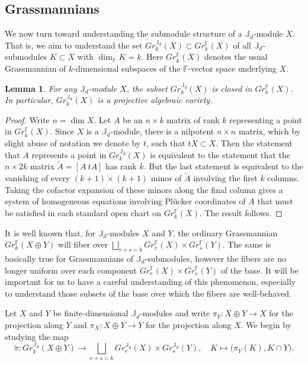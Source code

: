 \documentclass{amsart}
\numberwithin{equation}{section}
\newtheorem{lemma}[theorem]{Lemma}
\theoremstyle{definition}
\def\FF{\mathbb{F}}
\def\JJ{\mathbb{J}}
\def\dim{\operatorname{dim}}
\begin{document}
\subsection{Grassmannians}\label{sec:grassmannians}
We now turn toward understanding the submodule structure of a $\JJ_d$-module $X$.  That is, we aim to understand the set $Gr_k^{\JJ_d}(X)\subset Gr_k^\FF(X)$ of all $\JJ_d$-submodules $K\subset X$ with $\dim_\FF K=k$.  Here $Gr_k^\FF(X)$ denotes the usual Grassmannian of $k$-dimensional subspaces of the $\FF$-vector space underlying $X$.
\begin{lemma}\label{le:Grassmannian subvariety}
  For any $\JJ_d$-module $X$, the subset $Gr_k^{\JJ_d}(X)$ is closed in $Gr_k^\FF(X)$.  In particular, $Gr_k^{\JJ_d}(X)$ is a projective algebraic variety.
\end{lemma}
\begin{proof}
  Write $n=\dim X$.  Let $A$ be an $n\times k$ matrix of rank $k$ representing a point in $Gr_k^\FF(X)$.  Since $X$ is a $\JJ_d$-module, there is a nilpotent $n\times n$ matrix, which by slight abuse of notation we denote by $t$, such that $tX\subset X$.  Then the statement that $A$ represents a point in $Gr_k^{\JJ_d}(X)$ is equivalent to the statement that the $n\times 2k$ matrix $\tilde A=[A\ tA]$ has rank $k$.  But the last statement is equivalent to the vanishing of every $(k+1)\times(k+1)$ minor of $\tilde A$ involving the first $k$ columns.  Taking the cofactor expansion of these minors along the final column gives a system of homogeneous equations involving Pl\"ucker coordinates of $A$ that must be satisfied in each standard open chart on $Gr_k^\FF(X)$.  The result follows.
\end{proof}

It is well known that, for $\JJ_d$-modules $X$ and $Y$, the ordinary Grassmannian $Gr_k^\FF(X\oplus Y)$ will fiber over $\bigsqcup_{r+s=k} Gr_r^\FF(X)\times Gr_s^\FF(Y)$.  The same is basically true for Grassmannians of $\JJ_d$-submodules, however the fibers are no longer uniform over each component $Gr_r^\FF(X)\times Gr_s^\FF(Y)$ of the base.  It will be important for us to have a careful understanding of this phenomenon, especially to understand those subsets of the base over which the fibers are well-behaved.

Let $X$ and $Y$ be finite-dimensional $\JJ_d$-modules and write $\pi_Y:X\oplus Y\to X$ for the projection along $Y$ and $\pi_X:X\oplus Y\to Y$ for the projection along $X$.  We begin by studying the map 
\[\tilde\pi:Gr_k^{\JJ_d}(X\oplus Y)\to\bigsqcup_{r+s=k} Gr_r^{\JJ_d}(X)\times Gr_s^{\JJ_d}(Y),\quad K\mapsto \big(\pi_Y(K),K\cap Y\big).\]  
\end{document}
